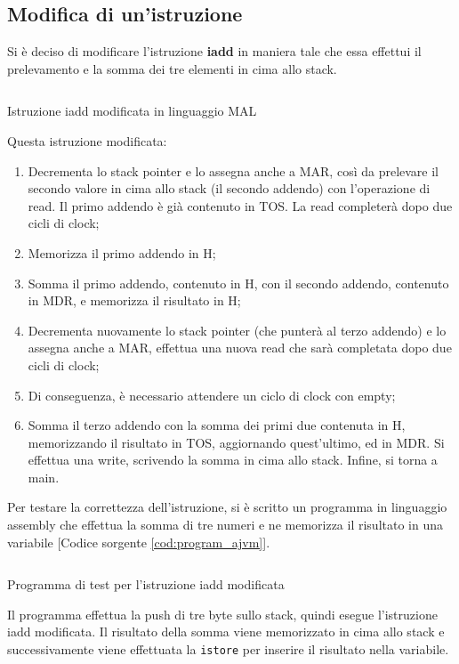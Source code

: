 \subsection{Modifica di un'istruzione}
Si è deciso di modificare l'istruzione \textbf{iadd} in maniera tale che essa effettui il prelevamento e la somma dei tre elementi in cima allo stack.

\begin{code}
    \inputminted{text}{mal-ajvm/iadd.mal}
    \caption{Istruzione iadd modificata in linguaggio MAL}
    \label{cod:iadd_mal}
\end{code}

Questa istruzione modificata:

\begin{enumerate}
    \item Decrementa lo stack pointer e lo assegna anche a MAR, così da prelevare il secondo valore in cima allo stack (il secondo addendo) con l'operazione di read. Il primo addendo è già contenuto in TOS. La read completerà dopo due cicli di clock;
    \item Memorizza il primo addendo in H;
    \item Somma il primo addendo, contenuto in H, con il secondo addendo, contenuto in MDR, e memorizza il risultato in H;
    \item Decrementa nuovamente lo stack pointer (che punterà al terzo addendo) e lo assegna anche a MAR, effettua una nuova read che sarà completata dopo due cicli di clock;
    \item Di conseguenza, è necessario attendere un ciclo di clock con empty;
    \item Somma il terzo addendo con la somma dei primi due contenuta in H, memorizzando il risultato in TOS, aggiornando quest'ultimo, ed in MDR. Si effettua una write, scrivendo la somma in cima allo stack. Infine, si torna a main.
\end{enumerate}

Per testare la correttezza dell'istruzione, si è scritto un programma in linguaggio assembly che effettua la somma di tre numeri e ne memorizza il risultato in una variabile [Codice sorgente \ref{cod:program_ajvm}].

\begin{code}
    \inputminted{ca65}{mal-ajvm/program.ajvm}
    \caption{Programma di test per l'istruzione iadd modificata}
    \label{cod:program_ajvm}
\end{code}

Il programma effettua la push di tre byte sullo stack, quindi esegue l'istruzione iadd modificata. Il risultato della somma viene memorizzato in cima allo stack e successivamente viene effettuata la \texttt{istore} per inserire il risultato nella variabile.


